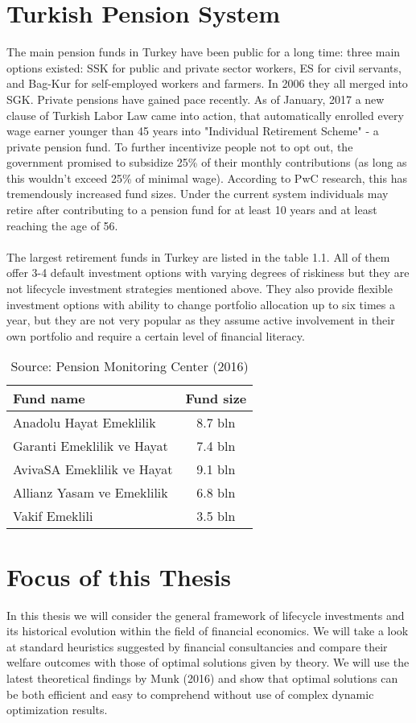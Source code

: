 \section{Turkish Pension System}
The main pension funds in Turkey have been public for a long time: three main options existed: SSK for public and private sector workers, ES for civil servants, and Bag-Kur for self-employed workers and farmers. In 2006 they all merged into SGK. Private pensions have gained pace recently. As of January, 2017 a new clause of Turkish Labor Law came into action, that automatically enrolled every wage earner younger than 45 years into "Individual Retirement Scheme" - a private pension fund. To further incentivize people not to opt out, the government promised to subsidize 25\% of their monthly contributions (as long as this wouldn't exceed 25\% of minimal wage). According to PwC research, this has tremendously increased fund sizes. Under the current system individuals may retire after contributing to a pension fund for at least 10 years and at least reaching the age of 56.
\paragraph*{}
The largest retirement funds in Turkey are listed in the table 1.1. All of them offer 3-4 default investment options with varying degrees of riskiness but they are not lifecycle investment strategies mentioned above. They also provide flexible investment options with ability to change portfolio allocation up to six times a year, but they are not very popular as they assume active involvement in their own portfolio and require a certain level of financial literacy. 

\begin{table}
	\centering
	\begin{tabular}[H]{lc}
		\hline
		Fund name&Fund size\\
		\hline
		Anadolu Hayat Emeklilik&8.7 bln\\
		Garanti Emeklilik ve Hayat&7.4 bln\\
		AvivaSA Emeklilik ve Hayat&9.1 bln\\
		Allianz Yasam ve Emeklilik&6.8 bln\\
		Vakif Emeklili&3.5 bln\\
		\hline
	\end{tabular}
	\caption{Source: Pension Monitoring Center (2016)}
\end{table}

\section{Focus of this Thesis}
In this thesis we will consider the general framework of lifecycle investments and its historical evolution within the field of financial economics. We will take a look at standard heuristics suggested by financial consultancies and compare their welfare outcomes with those of optimal solutions given by theory. We will use the latest theoretical findings by Munk (2016) and show that optimal solutions can be both efficient and easy to comprehend without use of complex dynamic optimization results.
